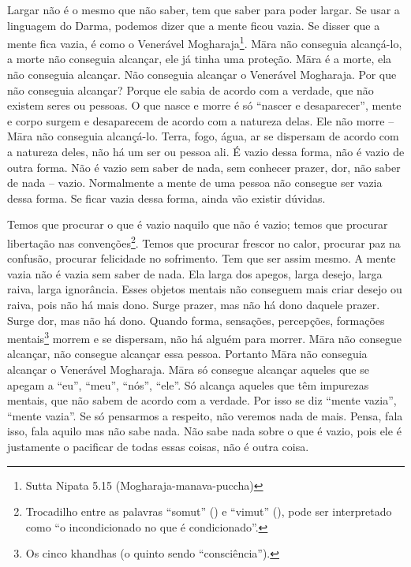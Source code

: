 Largar não é o mesmo que não saber, tem que saber para poder largar.
Se usar a linguagem do Darma, podemos dizer que a mente ficou vazia. Se
disser que a mente fica vazia, é como o Venerável
Mogharaja\footnote{Sutta Nipata 5.15 (Mogharaja-manava-puccha)}. M\=ara
não conseguia alcançá-lo, a morte não conseguia alcançar, ele já tinha
uma proteção. M\=ara é a morte, ela não conseguia alcançar. Não
conseguia alcançar o Venerável Mogharaja. Por que não conseguia
alcançar? Porque ele sabia de acordo com a verdade, que não existem
seres ou pessoas. O que nasce e morre é só “nascer e desaparecer”,
mente e corpo surgem e desaparecem de acordo com a natureza delas. Ele
não morre – M\=ara não conseguia alcançá-lo. Terra, fogo, água, ar se
dispersam de acordo com a natureza deles, não há um ser ou pessoa ali.
É vazio dessa forma, não é vazio de outra forma. Não é vazio sem saber
de nada, sem conhecer prazer, dor, não saber de nada – vazio.
Normalmente a mente de uma pessoa não consegue ser vazia dessa forma.
Se ficar vazia dessa forma, ainda vão existir dúvidas. 

Temos que procurar o que é vazio naquilo que não é vazio; temos que
procurar libertação nas convenções\footnote{Trocadilho entre as
palavras “somut” () e “vimut”
(), pode ser interpretado como “o
incondicionado no que é condicionado”.}. Temos que procurar frescor no
calor, procurar paz na confusão, procurar felicidade no sofrimento. Tem
que ser assim mesmo. A mente vazia não é vazia sem saber de nada. Ela
larga dos apegos, larga desejo, larga raiva, larga ignorância. Esses
objetos mentais não conseguem mais criar desejo ou raiva, pois não há
mais dono. Surge prazer, mas não há dono daquele prazer. Surge dor, mas
não há dono. Quando forma, sensações, percepções, formações
mentais\footnote{Os cinco khandhas (o quinto sendo “consciência”).}
morrem e se dispersam, não há alguém para morrer. M\=ara não consegue
alcançar, não consegue alcançar essa pessoa. Portanto M\=ara não
conseguia alcançar o Venerável Mogharaja. M\=ara só consegue alcançar
aqueles que se apegam a “eu”, “meu”, “nós”, “ele”. Só alcança aqueles
que têm impurezas mentais, que não sabem de acordo com a verdade. Por
isso se diz “mente vazia”, “mente vazia”. Se só pensarmos a respeito,
não veremos nada de mais. Pensa, fala isso, fala aquilo mas não sabe
nada. Não sabe nada sobre o que é vazio, pois ele é justamente o
pacificar de todas essas coisas, não é outra coisa. 


